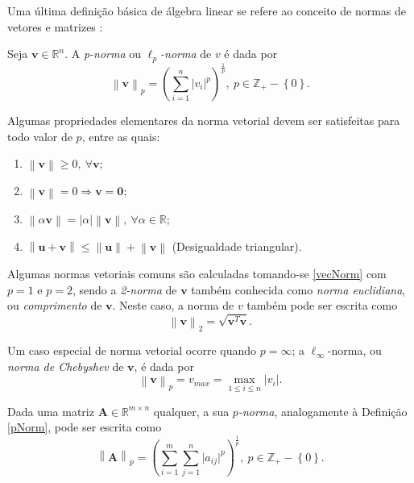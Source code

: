 Uma \'{u}ltima defini\c{c}\~{a}o b\'{a}sica de \'{a}lgebra linear se refere ao conceito de normas de vetores e matrizes \cite{yang}:

\begin{definition} \label{pNorm}
Seja $\mathbf{v} \in \mathbb{R}^{n}$. A \textit{p-norma} ou $\ell_p$\textit{-norma} de $v$ \'{e} dada por
\begin{equation}
	\label{vecNorm}
	\left\|\mathbf{v}\right\|_{p} = \left(\sum_{i=1}^{n}\lvert v_i \rvert ^{p}\right)^{\frac{1}{p}},~p \in \mathbb{Z}_{+} - \left\lbrace 0\right\rbrace.
\end{equation}
\end{definition}
Algumas propriedades elementares da norma vetorial devem ser satisfeitas para todo valor de $p$, entre as quais:
\begin{enumerate}[label=(\alph*)]
\item $\left\|\mathbf{v}\right\| \ge 0 ,~ \forall \mathbf{v}$;
\item $\left\|\mathbf{v}\right\| = 0 \Rightarrow \mathbf{v} = \mathbf{0}$;
\item $\left\|\alpha\mathbf{v}\right\| = \lvert\alpha\rvert \left\|\mathbf{v}\right\|,~ \forall \alpha \in \mathbb{R}$;
\item $\left\|\mathbf{u} + \mathbf{v}\right\| \le \left\|\mathbf{u}\right\| + \left\|\mathbf{v}\right\|$ (Desigualdade triangular).
\end{enumerate}

Algumas normas vetoriais comuns s\~{a}o calculadas tomando-se \eqref{vecNorm} com $p = 1$ e $p = 2$, sendo a \textit{2-norma} de $\mathbf{v}$ tamb\'{e}m conhecida como \textit{norma euclidiana}, ou \textit{comprimento} de $\mathbf{v}$. Neste caso, a norma de $v$ tamb\'{e}m pode ser escrita como
\begin{equation}
	\left\|\mathbf{v}\right\|_{2} = \sqrt{\mathbf{v}^T\mathbf{v}}.
\end{equation} 

Um caso especial de norma vetorial ocorre quando $p = \infty$; a $\ell_{\infty}$-norma, ou \textit{norma de Chebyshev} de $\mathbf{v}$, \'{e} dada por
\begin{equation}
\left\|\mathbf{v}\right\|_{p} = v_{max} = \max_{1 \le i \le n} \lvert v_i \rvert.
\end{equation}

\begin{definition}
Dada uma matriz $\mathbf{A} \in \mathbb{R}^{m \times n}$ qualquer, a sua \textit{$p$-norma}, analogamente \`{a} Defini\c{c}\~{a}o \ref{pNorm}, pode ser escrita como
\begin{equation}
	\label{matNorm}
	\left\|\mathbf{A}\right\|_{p} = \left(\sum_{i=1}^{m} \sum_{j=1}^{n}\lvert a_{ij} \rvert ^{p}\right)^{\frac{1}{p}},~p \in \mathbb{Z}_{+} - \left\lbrace 0\right\rbrace.
\end{equation}
\end{definition} 

